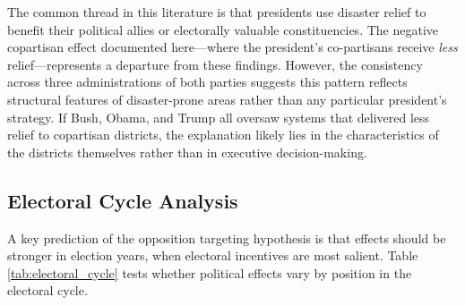 \documentclass[12pt,letterpaper,oneside]{book}
\newcommand{\basepath}{g:/My Drive/Grad School}
\newcommand{\basepath}{basepath}
\begin{document}
The common thread in this literature is that presidents use disaster relief to benefit their political allies or electorally valuable constituencies. The negative copartisan effect documented here---where the president's co-partisans receive \emph{less} relief---represents a departure from these findings. However, the consistency across three administrations of both parties suggests this pattern reflects structural features of disaster-prone areas rather than any particular president's strategy. If Bush, Obama, and Trump all oversaw systems that delivered less relief to copartisan districts, the explanation likely lies in the characteristics of the districts themselves rather than in executive decision-making.



\subsection{Electoral Cycle Analysis}

A key prediction of the opposition targeting hypothesis is that effects should be stronger in election years, when electoral incentives are most salient. Table \ref{tab:electoral_cycle} tests whether political effects vary by position in the electoral cycle.
\end{document}
